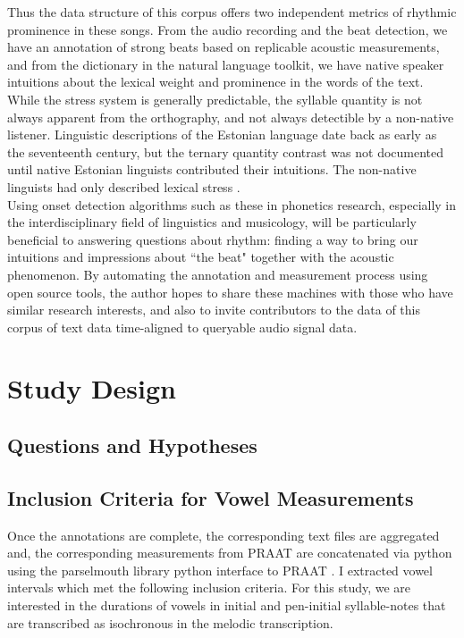 Thus the data structure of this corpus offers two independent metrics of rhythmic prominence in these songs. From the audio recording and the beat detection, we have an annotation of strong beats based on replicable acoustic measurements, and from the dictionary in the natural language toolkit, we have native speaker intuitions about the lexical weight and prominence in the words of the text. While the stress system is generally predictable, the syllable quantity is not always apparent from the orthography, and not always detectible by a non-native listener. Linguistic descriptions of the Estonian language date back as early as the seventeenth century, but the ternary quantity contrast was not documented until native Estonian linguists contributed their intuitions. The non-native linguists had only described lexical stress \citep{sargEarlyHistoryEstonian2005a}. \\

Using onset detection algorithms such as these \citep{robertsonBKeeperBeattrackerLive2007} in phonetics research, especially in the interdisciplinary field of linguistics and musicology, will be particularly beneficial to answering questions about rhythm: finding a way to bring our intuitions and impressions about ``the beat" together with the acoustic phenomenon. By automating the annotation and measurement process using open source tools, the author hopes to share these machines with those who have similar research interests, and also to invite contributors to the data of this corpus of text data time-aligned to queryable audio signal data. 

\section{Study Design}
\subsection{Questions and Hypotheses}

\subsection{Inclusion Criteria for Vowel Measurements}

Once the annotations are complete, the corresponding text files are aggregated and, the corresponding measurements from PRAAT are concatenated via python using the parselmouth library python interface to PRAAT \citep{parselmouth, van1995python}. 
 I extracted vowel intervals which met the following inclusion criteria. For this study, we are interested in the durations of vowels in initial and pen-initial syllable-notes that are transcribed as isochronous in the melodic transcription. 

